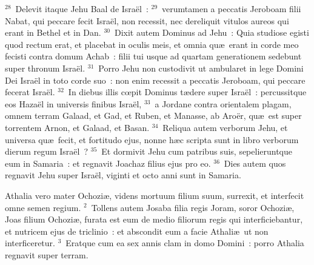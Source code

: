 ${}^{28}$~Delevit itaque Jehu Baal de Isra\"el~:
${}^{29}$~verumtamen a peccatis Jeroboam filii Nabat, qui peccare fecit Isra\"el, non recessit, nec dereliquit vitulos aureos qui erant in Bethel et in Dan.
${}^{30}$~Dixit autem Dominus ad Jehu~: Quia studiose egisti quod rectum erat, et placebat in oculis meis, et omnia qu\ae\ erant in corde meo fecisti contra domum Achab~: filii tui usque ad quartam generationem sedebunt super thronum Isra\"el.
${}^{31}$~Porro Jehu non custodivit ut ambularet in lege Domini Dei Isra\"el in toto corde suo~: non enim recessit a peccatis Jeroboam, qui peccare fecerat Isra\"el.
${}^{32}$~In diebus illis cœpit Dominus t\ae dere super Isra\"el~: percussitque eos Haza\"el in universis finibus Isra\"el,
${}^{33}$~a Jordane contra orientalem plagam, omnem terram Galaad, et Gad, et Ruben, et Manasse, ab Aro\"er, qu\ae\ est super torrentem Arnon, et Galaad, et Basan.
${}^{34}$~Reliqua autem verborum Jehu, et universa qu\ae\ fecit, et fortitudo ejus, nonne h\ae c scripta sunt in libro verborum dierum regum Isra\"el~?
${}^{35}$~Et dormivit Jehu cum patribus suis, sepelieruntque eum in Samaria~: et regnavit Joachaz filius ejus pro eo.
${}^{36}$~Dies autem quos regnavit Jehu super Isra\"el, viginti et octo anni sunt in Samaria.

\lettrine[lines=10,image=true,loversize=0.05,lraise=-0.03]{A}{}thalia vero mater Ochozi\ae , videns mortuum filium suum, surrexit, et interfecit omne semen regium.
${}^{2}$~Tollens autem Josaba filia regis Joram, soror Ochozi\ae , Joas filium Ochozi\ae , furata est eum de medio filiorum regis qui interficiebantur, et nutricem ejus de triclinio~: et abscondit eum a facie Athali\ae\ ut non interficeretur.
${}^{3}$~Eratque cum ea sex annis clam in domo Domini~: porro Athalia regnavit super terram.


